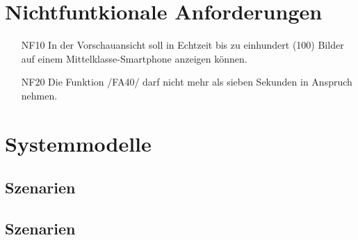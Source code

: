 \documentclass[parskip=full]{scrartcl}
\begin{document}
\section{Nichtfuntkionale Anforderungen}
\begin{itemize}[nosep]
\item[NF10] In der Vorschauansicht soll in Echtzeit bis zu einhundert (100)
Bilder auf einem Mittelklasse-Smartphone anzeigen können.
\item[NF20] Die Funktion /FA40/ darf nicht mehr als sieben Sekunden in Anspruch nehmen.
\end{itemize}
\printnoidxglossaries

\section{Systemmodelle}
\subsection{Szenarien}



\subsection{Szenarien}
\end{document}
